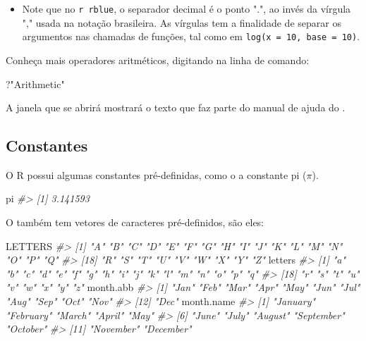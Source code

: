 \documentclass[]{book}
\newenvironment{Shaded}{\begin{snugshade}}{\end{snugshade}}
\newcommand{\StringTok}[1]{\textcolor[rgb]{0.31,0.60,0.02}{#1}}
\newcommand{\CommentTok}[1]{\textcolor[rgb]{0.56,0.35,0.01}{\textit{#1}}}
\newcommand{\NormalTok}[1]{#1}
\newenvironment{rmdblock}[1]
  {\begin{shaded*}
  \begin{itemize}
  \renewcommand{\labelitemi}{
    \raisebox{-.7\height}[0pt][0pt]{
      {\setkeys{Gin}{width=3em,keepaspectratio}\texttt{[image: images/\#1]}}
    }
  }
  \item
  }
  {
  \end{itemize}
  \end{shaded*}
  }
\newenvironment{rmdwarning}
  {\begin{rmdblock}{warning}}
  {\end{rmdblock}}
\begin{document}
\begin{rmdwarning}
Note que no \texttt{r\ rblue}, o separador decimal é o ponto ".", ao
invés da vírgula "," usada na notação brasileira. As vírgulas tem a
finalidade de separar os argumentos nas chamadas de funções, tal como em
\texttt{log(x\ =\ 10,\ base\ =\ 10)}.
\end{rmdwarning}

Conheça mais operadores aritméticos, digitando na linha de comando:

\begin{Shaded}
\begin{Highlighting}[]
\NormalTok{?}\StringTok{"Arithmetic"}
\end{Highlighting}
\end{Shaded}

A janela que se abrirá mostrará o texto que faz parte do manual de ajuda
do .

\subsection{Constantes}\label{constantes}

O R possui algumas constantes pré-definidas, como o a constante pi
(\(\pi\)).

\begin{Shaded}
\begin{Highlighting}[]
\NormalTok{pi}
\CommentTok{#> [1] 3.141593}
\end{Highlighting}
\end{Shaded}

O também tem vetores de caracteres pré-definidos, são eles:

\begin{Shaded}
\begin{Highlighting}[]
\NormalTok{LETTERS}
\CommentTok{#>  [1] "A" "B" "C" "D" "E" "F" "G" "H" "I" "J" "K" "L" "M" "N" "O" "P" "Q"}
\CommentTok{#> [18] "R" "S" "T" "U" "V" "W" "X" "Y" "Z"}
\NormalTok{letters}
\CommentTok{#>  [1] "a" "b" "c" "d" "e" "f" "g" "h" "i" "j" "k" "l" "m" "n" "o" "p" "q"}
\CommentTok{#> [18] "r" "s" "t" "u" "v" "w" "x" "y" "z"}
\NormalTok{month.abb}
\CommentTok{#>  [1] "Jan" "Feb" "Mar" "Apr" "May" "Jun" "Jul" "Aug" "Sep" "Oct" "Nov"}
\CommentTok{#> [12] "Dec"}
\NormalTok{month.name}
\CommentTok{#>  [1] "January"   "February"  "March"     "April"     "May"      }
\CommentTok{#>  [6] "June"      "July"      "August"    "September" "October"  }
\CommentTok{#> [11] "November"  "December"}
\end{Highlighting}
\end{Shaded}
\end{document}
